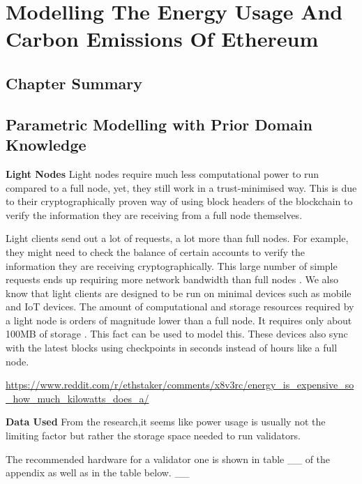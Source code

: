 \chapter{Modelling The Energy Usage And Carbon Emissions Of Ethereum}
\label{Modelling}

\section{Chapter Summary}


\section{Parametric Modelling with Prior Domain Knowledge}

\textbf{Light Nodes}
Light nodes require much less computational power to run compared to a full node, yet, they still work in a trust-minimised way. This is due to their cryptographically proven way of using block headers of the blockchain to verify the information they are receiving from a full 
node themselves. 

Light clients send out a lot of requests, a lot more than full nodes. For example, they might need to check the balance of certain accounts to verify the information they are receiving cryptographically. This large number of simple requests ends up requiring more network bandwidth than full nodes \cite{WhatTechnologies}. We also know that light clients are designed to be run on minimal devices such as mobile and IoT devices. The amount of computational and storage resources required by a light node is orders of magnitude lower than a full node. It requires only about 100MB of storage \cite{WhatTechnologies}. This fact can be used to model this. These devices also sync with the latest blocks using checkpoints in seconds instead of hours like a full node.

\url{https://www.reddit.com/r/ethstaker/comments/x8v3rc/energy_is_expensive_so_how_much_kilowatts_does_a/}


\textbf{Data Used}
From the research,it seems like power usage is usually not the limiting factor but rather the storage space needed to run validators.

The recommended hardware for a validator one is shown in table \_\_ of the appendix as well as in the table below. \_\_

